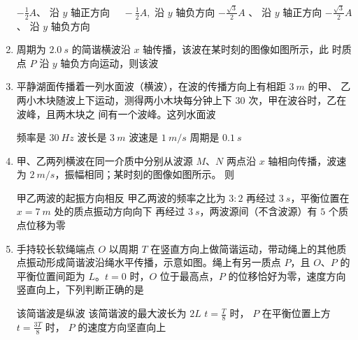 \begin{enumerate}
\fourchoices
{$-\frac{1}{2} A 、$ 沿 $y$ 轴正方向}
{$\quad-\frac{1}{2} A,$ 沿 $y$ 轴负方向}
{$-\frac{\sqrt{3}}{2} A$ 、 沿 $y$ 轴正方向}
{$-\frac{\sqrt{3}}{2} A $、 沿 $y$ 轴负方向}



\item 
{}
周期为 $ 2.0 \ s $ 的简谐横波沿 $ x $ 轴传播，该波在某时刻的图像如图所示，此
时质点 $ P $ 沿 $ y $ 轴负方向运动，则该波  
\begin{figure}[h!]
	\centering
	
\end{figure}

\item 
{}
平静湖面传播着一列水面波（横波），在波的传播方向上有相距 $ 3 \ m $ 的甲、
乙两小木块随波上下运动，测得两小木块每分钟上下 $ 30 $ 次，甲在波谷时，乙在波峰，且两木块之
间有一个波峰。这列水面波  


\fourchoices
{频率是 $ 30 \ Hz $}
{波长是 $ 3 \ m $}
{波速是 $ 1 \ m /s $}
{周期是 $ 0.1 \ s $}


\item 
{}
甲、乙两列横波在同一介质中分别从波源 $ M $、$ N $ 两点沿 $ x $ 轴相向传播，波速为
$ 2 \ m /s $，振幅相同；某时刻的图像如图所示。
则  
\begin{figure}[h!]
	\centering
	
\end{figure}

\fourchoices
{甲乙两波的起振方向相反}
{甲乙两波的频率之比为 $ 3:2 $}
{再经过 $ 3 \ s $，平衡位置在 $ x=7 \ m $ 处的质点振动方向向下}
{再经过 $ 3 \ s $，两波源间（不含波源）有 $ 5 $ 个质点位移为零}


\item 
{}
手持较长软绳端点 $ O $ 以周期 $ T $ 在竖直方向上做简谐运动，带动绳上的其他质
点振动形成简谐波沿绳水平传播，示意如图。绳上有另一质点 $ P $，且 $ O $、$ P $ 的平衡位置间距为 $ L $。$ t=0 $
时，$ O $ 位于最高点，$ P $ 的位移恰好为零，速度方向竖直向上，下列判断正确的是  
\begin{figure}[h!]
	\centering
	
\end{figure}

\fourchoices
{该简谐波是纵波}
{该简谐波的最大波长为 $ 2L $}
{$t=\frac{T}{8}$ 时， $P$ 在平衡位置上方}
{$t=\frac{3 T}{8}$ 时， $P$ 的速度方向坚直向上}


	
	
	
\end{enumerate}

